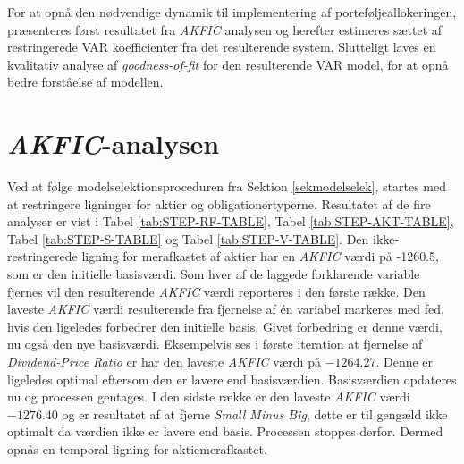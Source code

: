 \documentclass[
  a4paper,
  oneside]{memoir}
\begin{document}
For at opnå den nødvendige dynamik til implementering af porteføljeallokeringen, præsenteres først resultatet fra \emph{AKFIC} analysen og herefter estimeres sættet af restringerede VAR koefficienter fra det resulterende system. Slutteligt laves en kvalitativ analyse af \emph{goodness-of-fit} for den resulterende VAR model, for at opnå bedre forståelse af modellen.

\hypertarget{akficana}{%
\section{\texorpdfstring{\emph{AKFIC}-analysen}{AKFIC-analysen}}\label{akficana}}

Ved at følge modelselektionsproceduren fra Sektion \ref{sekmodelselek}, startes med at restringere ligninger for aktier og obligationertyperne. Resultatet af de fire analyser er vist i Tabel \ref{tab:STEP-RF-TABLE}, Tabel \ref{tab:STEP-AKT-TABLE}, Tabel \ref{tab:STEP-S-TABLE} og Tabel \ref{tab:STEP-V-TABLE}. Den ikke-restringerede ligning for merafkastet af aktier har en \emph{AKFIC} værdi på -1260.5, som er den initielle basisværdi. Som hver af de laggede forklarende variable fjernes vil den resulterende \emph{AKFIC} værdi reporteres i den første række. Den laveste \emph{AKFIC} værdi resulterende fra fjernelse af én variabel markeres med fed, hvis den ligeledes forbedrer den initielle basis. Givet forbedring er denne værdi, nu også den nye basisværdi. Eksempelvis ses i første iteration at fjernelse af \emph{Dividend-Price Ratio} er har den laveste \emph{AKFIC} værdi på \(-1264.27\). Denne er ligeledes optimal eftersom den er lavere end basisværdien. Basisværdien opdateres nu og processen gentages. I den sidste række er den laveste \emph{AKFIC} værdi \(-1276.40\) og er resultatet af at fjerne \emph{Small Minus Big}, dette er til gengæld ikke optimalt da værdien ikke er lavere end basis. Processen stoppes derfor. Dermed opnås en temporal ligning for aktiemerafkastet.
\end{document}
